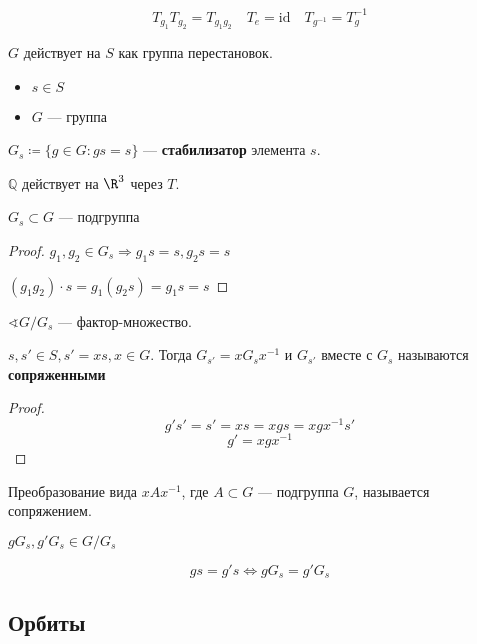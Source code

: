 \begin{remark}
    \[T_{g_1} T_{g_2} = T_{g_1g_2} \quad T_e = \mathrm{id} \quad T_{g^{-1}} = T_g^{-1}\]
\end{remark}

\(G\) действует на \(S\) как группа перестановок.

\begin{definition}\itemfix
    \begin{itemize}
        \item \(s \in S\)
        \item \(G\) --- группа
    \end{itemize}

    \(G_s \coloneqq \{g \in G : gs = s\}\) --- \textbf{стабилизатор} элемента \(s\).
\end{definition}

\begin{example}
    \(\mathbb{Q}\) действует на \(\R^3\) через \(T\).
\end{example}

\begin{lemma}
    \(G_s \subset G\) --- подгруппа
\end{lemma}
\begin{proof}
    \(g_1, g_2 \in G_s \Rightarrow g_1 s = s, g_2 s = s\)

    \((g_1g_2) \cdot s = g_1(g_2 s) = g_1s = s\)
\end{proof}

\(\sphericalangle G / G_s\) --- фактор-множество.

\begin{lemma}
    \(s, s' \in S, s' = xs, x \in G\). Тогда \(G_{s'} = xG_sx^{-1}\) и \(G_{s'}\) вместе с \(G_s\) называются \textbf{сопряженными}
\end{lemma}
\begin{proof}
    \[g's' = s' = xs = xgs = xgx^{-1}s'\]
    \[g' = xgx^{-1}\]
\end{proof}

\begin{definition}
    Преобразование вида \(xAx^{-1}\), где \(A \subset G\) --- подгруппа \(G\), называется сопряжением.
\end{definition}

\begin{lemma}
    \(g G_s, g'G_s \in G / G_s\)

    \[gs = g's \Leftrightarrow g G_s = g' G_s\]
\end{lemma}

\subsection{Орбиты}

